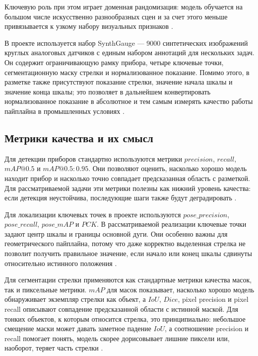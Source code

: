 \documentclass[a4paper,14pt]{extarticle}
\begin{document}
Ключевую роль при этом играет доменная рандомизация: модель обучается на большом числе искусственно разнообразных сцен и за счет этого меньше привязывается к узкому набору визуальных признаков \cite{tobin2017,horvath2023,zhang2019}.

В проекте используется набор SynthGauge --- 9000 синтетических изображений круглых аналоговых датчиков с единым набором аннотаций для нескольких задач. Он содержит ограничивающую рамку прибора, четыре ключевые точки, сегментационную маску стрелки и нормализованное показание. Помимо этого, в разметке также присутствуют показание стрелки, значение начала шкалы и значение конца шкалы; это позволяет в дальнейшем конвертировать нормализованное показание в абсолютное и тем самым измерять качество работы пайплайна в промышленных условиях \cite{leon2024,synthgaugehf2026}.

	\subsection{Метрики качества и их смысл}

	Для детекции приборов стандартно используются метрики $precision$, $recall$, $mAP@0.5$ и $mAP@0.5:0.95$. Они позволяют оценить, насколько хорошо модель находит прибор и насколько точно совпадает предсказанная область с разметкой. Для рассматриваемой задачи эти метрики полезны как нижний уровень качества: если детекция неустойчива, последующие шаги также будут деградировать \cite{yoloSurvey2022}.

Для локализации ключевых точек в проекте используются $pose\_precision$, $pose\_recall$, $pose\_mAP$ и $PCK$. В рассматриваемой реализации ключевые точки задают центр шкалы и границы основной дуги. Они особенно важны для геометрического пайплайна, потому что даже корректно выделенная стрелка не позволит получить правильное значение, если начало или конец шкалы сдвинуты относительно истинного положения \cite{howells2021,sciRep2025}.

Для сегментации стрелки применяются как стандартные метрики качества масок, так и пиксельные метрики. $mAP$ для масок показывает, насколько хорошо модель обнаруживает экземпляр стрелки как объект, а $IoU$, $Dice$, pixel precision и pixel recall описывают совпадение предсказанной области с истинной маской. Для тонких объектов, к которым относится стрелка, это принципиально: небольшое смещение маски может давать заметное падение $IoU$, а соотношение precision и recall помогает понять, модель скорее дорисовывает лишние пиксели или, наоборот, теряет часть стрелки \cite{maskrcnn2017,deeplab2016,unet2015}.
\end{document}
